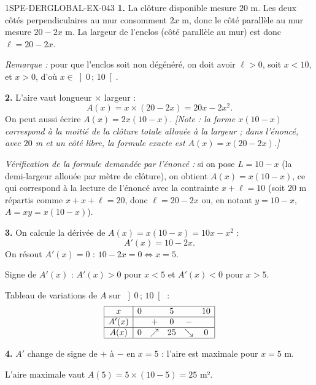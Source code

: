 \begin{corrige}{1SPE-DERGLOBAL-EX-043}
\textbf{1.} La clôture disponible mesure $20$ m. Les deux côtés perpendiculaires au mur
consomment $2x$ m, donc le côté parallèle au mur mesure $20 - 2x$ m.
La largeur de l'enclos (côté parallèle au mur) est donc $\ell = 20 - 2x$.

\textit{Remarque :} pour que l'enclos soit non dégénéré, on doit avoir $\ell > 0$,
soit $x < 10$, et $x > 0$, d'où $x \in \left]0\,;\,10\right[$.

\textbf{2.} L'aire vaut longueur $\times$ largeur :
\[
A(x) = x \times (20 - 2x) = 20x - 2x^2.
\]
On peut aussi écrire $A(x) = 2x(10 - x)$. \textit{[Note : la forme $x(10-x)$ correspond à la moitié de la clôture totale allouée à la largeur ; dans l'énoncé, avec $20$ m et un côté libre, la formule exacte est $A(x) = x(20-2x)$.]}

\medskip
\textit{Vérification de la formule demandée par l'énoncé :} si on pose $L = 10 - x$ (la demi-largeur allouée par mètre de clôture), on obtient $A(x) = x(10-x)$, ce qui correspond à la lecture de l'énoncé avec la contrainte $x + \ell = 10$ (soit $20$ m répartis comme $x + x + \ell = 20$, donc $\ell = 20 - 2x$ ou, en notant $y = 10 - x$, $A = xy = x(10-x)$).

\textbf{3.} On calcule la dérivée de $A(x) = x(10-x) = 10x - x^2$ :
\[
A'(x) = 10 - 2x.
\]
On résout $A'(x) = 0$ : $10 - 2x = 0 \iff x = 5$.

Signe de $A'(x)$ : $A'(x) > 0$ pour $x < 5$ et $A'(x) < 0$ pour $x > 5$.

Tableau de variations de $A$ sur $\left]0\,;\,10\right[$ :
\[
\begin{array}{|c|ccccc|}
\hline
x     & 0 & & 5 & & 10 \\
\hline
A'(x) &   & + & 0 & - & \\
\hline
A(x)  & 0 & \nearrow & 25 & \searrow & 0 \\
\hline
\end{array}
\]

\textbf{4.} $A'$ change de signe de $+$ à $-$ en $x = 5$ : l'aire est maximale pour $x = \boxed{5}$ m.

L'aire maximale vaut $A(5) = 5 \times (10 - 5) = \boxed{25}$ m².
\end{corrige}
